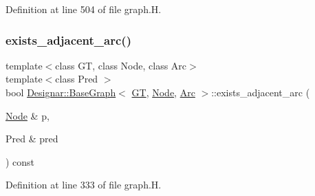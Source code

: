 Definition at line 504 of file graph.\+H.

\mbox{\label{class_designar_1_1_base_graph_a5208fcd131d919271e1d54f6e45ab3e9}} 
\subsubsection{\texorpdfstring{exists\+\_\+adjacent\+\_\+arc()}{exists\_adjacent\_arc()}\hspace{0.1cm}{\footnotesize\ttfamily [1/2]}}
{\footnotesize\ttfamily template$<$class GT, class Node, class Arc$>$ \\
template$<$class Pred $>$ \\
bool \hyperlink{class_designar_1_1_base_graph}{Designar\+::\+Base\+Graph}$<$ \hyperlink{demo-buildgraph_8_c_a3001c40d2c31ca87ed96cd7d1334a55e}{GT}, \hyperlink{namespace_designar_a5af326c65aa2bd26b26c410f2030d09e}{Node}, \hyperlink{namespace_designar_a3f55fb5513d62ff47cbc8f72b8e95d6f}{Arc} $>$\+::exists\+\_\+adjacent\+\_\+arc (\begin{DoxyParamCaption}\item[{\hyperlink{namespace_designar_a5af326c65aa2bd26b26c410f2030d09e}{Node} \&}]{p,  }\item[{Pred \&}]{pred }\end{DoxyParamCaption}) const\hspace{0.3cm}{\ttfamily [inline]}}



Definition at line 333 of file graph.\+H.

\mbox{\label{class_designar_1_1_base_graph_a16d3fbb089265c1dc8da8ffbe2fb1434}} 
